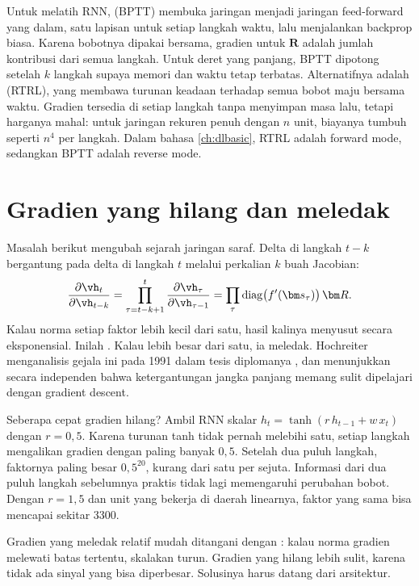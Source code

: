 Untuk melatih RNN,  (BPTT) membuka jaringan menjadi jaringan
feed-forward yang dalam, satu lapisan untuk setiap langkah waktu, lalu menjalankan backprop
biasa. Karena bobotnya dipakai bersama, gradien untuk $\bm R$ adalah jumlah kontribusi dari semua
langkah. Untuk deret yang panjang, BPTT dipotong setelah $k$ langkah supaya memori dan waktu
tetap terbatas. Alternatifnya adalah  (RTRL), yang membawa
turunan keadaan terhadap semua bobot maju bersama waktu. Gradien tersedia di setiap langkah tanpa
menyimpan masa lalu, tetapi harganya mahal: untuk jaringan rekuren penuh dengan $n$ unit,
biayanya tumbuh seperti $n^4$ per langkah. Dalam bahasa \cref{ch:dlbasic}, RTRL adalah forward
mode, sedangkan BPTT adalah reverse mode.

\section{Gradien yang hilang dan meledak}

Masalah berikut mengubah sejarah jaringan saraf. Delta di langkah $t-k$ bergantung pada delta di
langkah $t$ melalui perkalian $k$ buah Jacobian:
\begin{equation}
\frac{\partial\vh_t}{\partial\vh_{t-k}}=\prod_{\tau=t-k+1}^{t}\frac{\partial\vh_\tau}{\partial\vh_{\tau-1}}
=\prod_{\tau}\mathrm{diag}\big(f'(\bm s_\tau)\big)\,\bm R.
\end{equation}
Kalau norma setiap faktor lebih kecil dari satu, hasil kalinya menyusut secara eksponensial.
Inilah . Kalau lebih besar dari satu, ia meledak. Hochreiter
menganalisis gejala ini pada 1991 dalam tesis diplomanya \citep{hochreiter1991}, dan
\citet{bengio1994} menunjukkan secara independen bahwa ketergantungan jangka panjang memang sulit
dipelajari dengan gradient descent.

Seberapa cepat gradien hilang? Ambil RNN skalar $h_t=\tanh(r\,h_{t-1}+w\,x_t)$ dengan $r=0{,}5$.
Karena turunan tanh tidak pernah melebihi satu, setiap langkah mengalikan gradien dengan paling
banyak $0{,}5$. Setelah dua puluh langkah, faktornya paling besar $0{,}5^{20}$, kurang dari satu
per sejuta. Informasi dari dua puluh langkah sebelumnya praktis tidak lagi memengaruhi
perubahan bobot. Dengan $r=1{,}5$ dan unit yang bekerja di daerah linearnya, faktor yang sama bisa
mencapai sekitar 3300.

Gradien yang meledak relatif mudah ditangani dengan : kalau norma gradien
melewati batas tertentu, skalakan turun. Gradien yang hilang lebih sulit, karena tidak ada sinyal
yang bisa diperbesar. Solusinya harus datang dari arsitektur.

